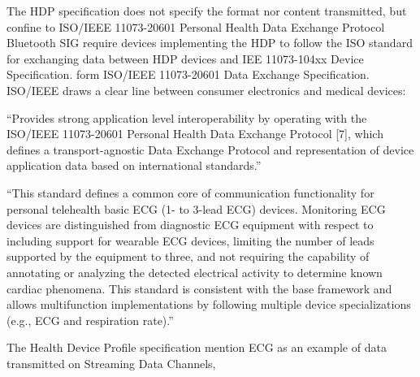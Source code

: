 The HDP specification does not specify the format nor content transmitted, but confine to ISO/IEEE 11073-20601 Personal Health Data Exchange Protocol \cite{newRef_18} Bluetooth SIG require devices implementing the HDP to follow the ISO standard for exchanging data between HDP devices and IEE 11073-104xx Device Specification. form ISO/IEEE 11073-20601 Data Exchange Specification. ISO/IEEE draws a clear line between consumer electronics and medical devices: 

``Provides strong application level interoperability by operating with the ISO/IEEE 11073-20601 Personal Health Data Exchange Protocol [7], which defines a transport-agnostic Data Exchange Protocol and representation of device application data based on international standards.''

``This standard defines a common core of communication functionality for personal telehealth basic ECG (1- to 3-lead ECG) devices. Monitoring ECG devices are distinguished from diagnostic ECG equipment with respect to including support for wearable ECG devices, limiting the number of leads supported by the equipment to three, and not requiring the capability of annotating or analyzing the detected electrical activity to determine known cardiac phenomena. This standard is consistent with the base framework and allows multifunction implementations by following multiple device specializations (e.g., ECG and respiration rate).'' \cite{newRef_18}

The Health Device Profile specification mention ECG as an example of data transmitted on Streaming Data Channels,



